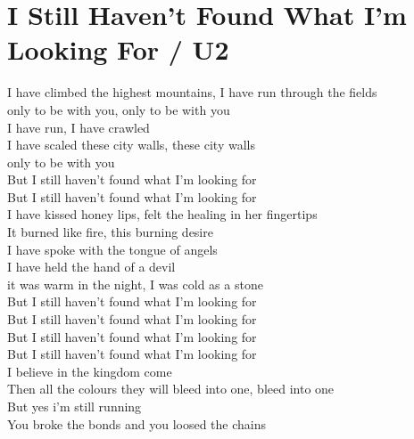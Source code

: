 \section{I Still Haven't Found What I'm Looking For / U2}\label{sec:istillhaventfoundwhatimlookingfor}

\Cmajor
\CsusFour
\Gmajor
  
I have    climbed the highest mountains, I have run through the fields\\
only to  be with you, only to  be with you\\
 I have run, I have crawled\\
I have scaled these city walls, these city  walls\\
only to  be with you\\
But I  still haven't  found what I'm  looking for\\
But I  still haven't  found what I'm  looking for  \\
I have  kissed honey lips, felt the healing in her fingertips\\
It burned like  fire, this burning desire\\
 I have spoke with the tongue of angels\\
 I have held the hand of a devil\\
it was warm in the  night, I was cold as a  stone\\
But I  still haven't  found what I'm  looking for\\
But I  still haven't  found what I'm  looking for  \\
But I  still haven't  found what I'm  looking for\\
But I  still haven't  found what I'm  looking for  \\
I believe in the kingdom come\\
Then all the colours they will bleed into one, bleed into  one\\
But yes i'm still  running\\
You broke the  bonds and you loosed the chains\\
